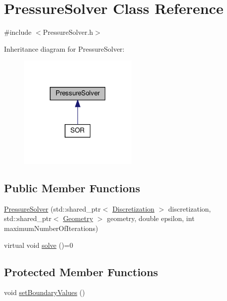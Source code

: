 \hypertarget{classPressureSolver}{}\section{Pressure\+Solver Class Reference}
\label{classPressureSolver}


{\ttfamily \#include $<$Pressure\+Solver.\+h$>$}



Inheritance diagram for Pressure\+Solver\+:\nopagebreak
\begin{figure}[H]
\begin{center}
\leavevmode
\includegraphics[width=163pt]{classPressureSolver__inherit__graph}
\end{center}
\end{figure}
\subsection*{Public Member Functions}
\begin{DoxyCompactItemize}
\item 
\mbox{\hyperlink{classPressureSolver_a0b18d1b4b728c717acb60e17d8afc2e9}{Pressure\+Solver}} (std\+::shared\+\_\+ptr$<$ \mbox{\hyperlink{classDiscretization}{Discretization}} $>$ discretization, std\+::shared\+\_\+ptr$<$ \mbox{\hyperlink{classGeometry}{Geometry}} $>$ geometry, double epsilon, int maximum\+Number\+Of\+Iterations)
\item 
virtual void \mbox{\hyperlink{classPressureSolver_a504ac61a1317650e0eb70d6a93212ca0}{solve}} ()=0
\end{DoxyCompactItemize}
\subsection*{Protected Member Functions}
\begin{DoxyCompactItemize}
\item 
void \mbox{\hyperlink{classPressureSolver_a458c383fcacaf54c1a333a271049ca93}{set\+Boundary\+Values}} ()
\end{DoxyCompactItemize}
